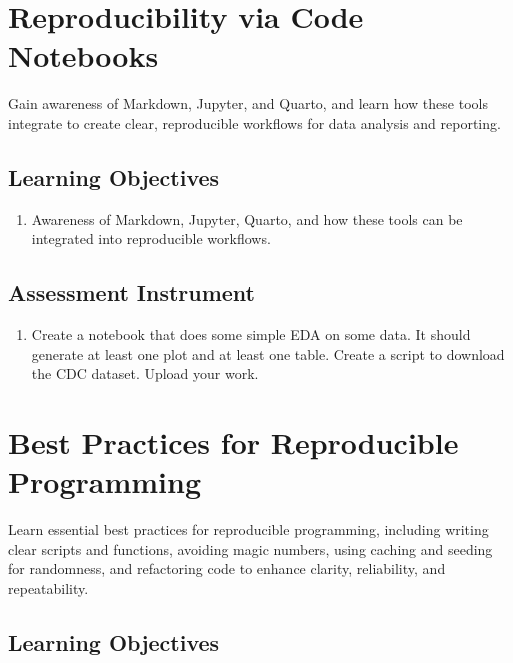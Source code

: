 \section{Reproducibility via Code Notebooks}
\label{sec:5.2}

Gain awareness of Markdown, Jupyter, and Quarto, and learn how these tools integrate to create clear, reproducible workflows for data analysis and reporting.

\subsection{Learning Objectives}

\begin{enumerate}
    \item Awareness of Markdown, Jupyter, Quarto, and how these tools can be integrated into reproducible workflows.
\end{enumerate}

\subsection{Assessment Instrument}

\begin{enumerate}
    \item Create a notebook that does some simple EDA on some data. It should generate at least one plot and at least one table. Create a script to download the CDC dataset. Upload your work.
\end{enumerate}

\section{Best Practices for Reproducible Programming}
\label{sec:5.3}

Learn essential best practices for reproducible programming, including writing clear scripts and functions, avoiding magic numbers, using caching and seeding for randomness, and refactoring code to enhance clarity, reliability, and repeatability.

\subsection{Learning Objectives}

